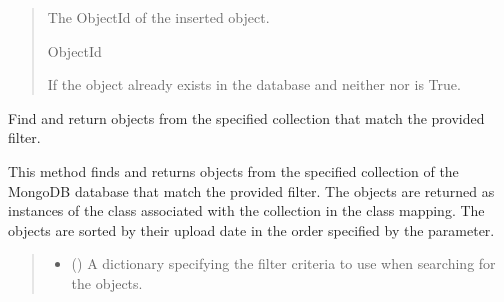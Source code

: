 \documentclass[letterpaper,10pt,english]{sphinxmanual}
\begin{document}
\begin{fulllineitems}
\begin{fulllineitems}
\begin{quote}
\begin{description}
\sphinxAtStartPar
The ObjectId of the inserted object.

\sphinxAtStartPar
ObjectId

\sphinxAtStartPar
{} \textendash{} If the object already exists in the database and neither  nor  is True.

\end{description}\end{quote}

\end{fulllineitems}


\begin{fulllineitems}
\label{\detokenize{forensicfit.database.database:forensicfit.database.database.Database.find}}
\pysigstartsignatures
{}
\pysigstopsignatures
\sphinxAtStartPar
Find and return objects from the specified collection that match the provided filter.

\sphinxAtStartPar
This method finds and returns objects from the specified collection of the MongoDB database
that match the provided filter. The objects are returned as instances of the class associated
with the collection in the class mapping. The objects are sorted by their upload date in the
order specified by the  parameter.
\begin{quote}\begin{description}
\sphinxAtStartPar
{}

\begin{itemize}
\item {} 
\sphinxAtStartPar
{} () \textendash{} A dictionary specifying the filter criteria to use when searching for the objects.


\end{itemize}
\end{description}
\end{quote}
\end{fulllineitems}
\end{fulllineitems}
\end{document}
